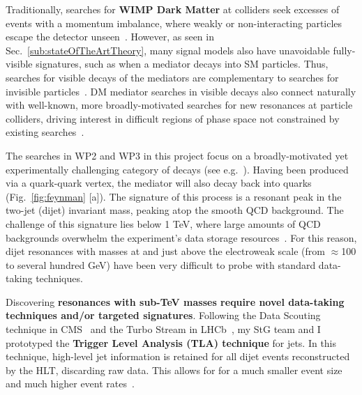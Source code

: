 Traditionally, searches for \textbf{WIMP Dark Matter} at colliders seek excesses of events with a momentum imbalance, where weakly or non-interacting particles escape the detector unseen~\cite{Boveia:2018yeb}. 
However, as seen in Sec.~\ref{sub:stateOfTheArtTheory}, many signal models also have unavoidable fully-visible signatures, such as when a mediator decays into SM particles.
Thus, searches for visible decays of the mediators are complementary to searches for invisible particles~\cite{CMSSummary,ATLASSummary}.
DM mediator searches in visible decays also connect naturally with well-known, more broadly-motivated searches for new resonances at particle colliders, driving interest in difficult regions of phase space not constrained by existing searches~\cite{Kim:2019rhy}.%

The searches in WP2 and WP3 in this project focus on a broadly-motivated yet experimentally challenging category of decays (see e.g.~\cite{Chala:2015ama}). 
Having been produced via a quark-quark vertex, the mediator will also decay back into quarks (Fig.~\ref{fig:feynman} [a]). 
The signature of this process is a resonant peak in the two-jet (dijet) invariant mass, peaking atop the smooth QCD background.
The challenge of this signature lies below 1 TeV, where large amounts of QCD backgrounds overwhelm the experiment’s data storage resources~\cite{Sirunyan:2019vgj,Aad:2019hjw}. %
For this reason, dijet resonances with masses at and just above the electroweak scale (from $\approx$100 to several hundred GeV) have been very difficult to probe with standard data-taking techniques. 

Discovering \textbf{resonances with sub-TeV masses require novel data-taking techniques and/or targeted signatures}. 
Following the Data Scouting technique in CMS~\cite{Khachatryan:2016ecr} and the Turbo Stream in LHCb~\cite{Aaij:2016rxn}, my StG team and I prototyped the \textbf{Trigger Level Analysis (TLA) technique} for jets. 
In this technique, high-level jet information is retained for all dijet events reconstructed by the HLT, discarding raw data. 
This allows for for a much smaller event size and much higher event rates~\cite{Aaboud:2018fzt}.%
%

